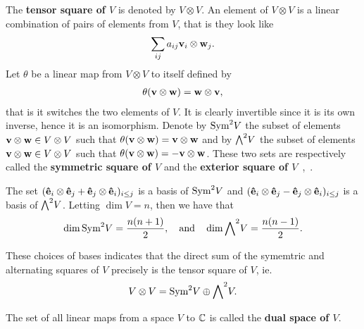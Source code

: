 \begin{example}
	The \textbf{tensor square of $V$} is denoted by $V \otimes V$. An element of $V \otimes V$ is a linear combination of pairs of elements from $V$, that is they look like
	\begin{align*}
		\sum_{ij} a_{ij} \mathbf{v}_i \otimes \mathbf{w}_j.
	\end{align*}
	Let $\theta$ be a linear map from $V \otimes V$ to itself defined by 
	\begin{align*}
		\theta(\mathbf{v} \otimes \mathbf{w}) = \mathbf{w} \otimes \mathbf{v},
	\end{align*}
	that is it switches the two elements of $V$. It is clearly invertible since it is its own inverse, hence it is an isomorphism. Denote by $\text{Sym}^2 V$ the subset of elements $\mathbf{v} \otimes \mathbf{w} \in V \otimes V$ such that $\theta(\mathbf{v} \otimes \mathbf{w}) = \mathbf{v} \otimes \mathbf{w}$ and by ${\bigwedge}^2 V$ the subset of elements $\mathbf{v} \otimes \mathbf{w} \in V \otimes V$ such that $\theta(\mathbf{v} \otimes \mathbf{w}) = -\mathbf{v} \otimes \mathbf{w}$. These two sets are respectively called the \textbf{symmetric square of $V$} and the \textbf{exterior square of $V$}~\cite[Sect.1.6.]{Serre},~\cite[Sects.1.1,B.2.]{FultonHarris}.
	
	The set $(\mathbf{\hat{e}}_i \otimes \mathbf{\hat{e}}_j + \mathbf{\hat{e}}_j \otimes \mathbf{\hat{e}}_i)_{i \leq j}$ is a basis of $\text{Sym}^2 V$ and $(\mathbf{\hat{e}}_i \otimes \mathbf{\hat{e}}_j - \mathbf{\hat{e}}_j \otimes \mathbf{\hat{e}}_i)_{i \leq j}$ is a basis of ${\bigwedge}^2 V$. Letting $\dim V = n$, then we have that 
	\begin{align*}
		\dim \text{Sym}^2 V = \frac{n(n+1)}{2},\quad\text{and}\quad \dim {\bigwedge}^2 V = \frac{n(n-1)}{2}.
	\end{align*}
	
	These choices of bases indicates that the direct sum of the symemtric and alternating squares of $V$ precisely is the tensor square of $V$, ie.
	\begin{align*}
		V \otimes V = \text{Sym}^2 V \oplus {\bigwedge}^2 V.
	\end{align*}
\end{example}

The set of all linear maps from a space $V$ to $\mathbb{C}$ is called the \textbf{dual space of $V$}.

